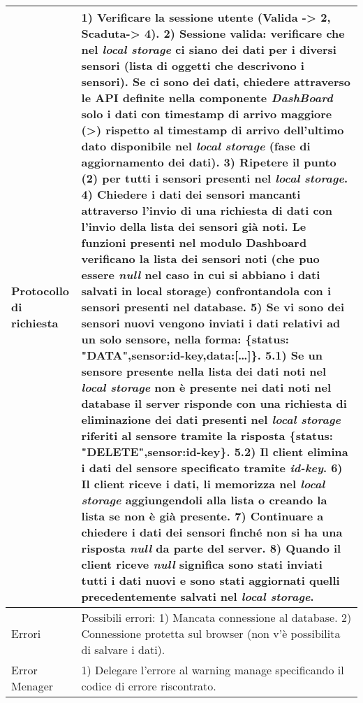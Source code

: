 \documentclass[onecolumn,a4paper]{article}
\begin{document}
\begin{longtable}{|p{3cm}|p{10cm}|}
Protocollo di richiesta & 1) Verificare la sessione utente (Valida -> 2, Scaduta-> 4). 2) Sessione valida: verificare che nel \emph{local storage} ci siano dei dati per i diversi sensori (lista di oggetti che descrivono i sensori). Se ci sono dei dati, chiedere attraverso le API definite nella componente \emph{DashBoard} solo i dati con timestamp di arrivo maggiore (>) rispetto al timestamp di arrivo dell'ultimo dato disponibile nel \emph{local storage} (fase di aggiornamento dei dati). 3) Ripetere il punto (2) per tutti i sensori presenti nel \emph{local storage}. 4) Chiedere i dati dei sensori mancanti attraverso l'invio di una richiesta di dati con l'invio della lista dei sensori già noti. Le funzioni presenti nel modulo Dashboard verificano la lista dei sensori noti (che puo essere \emph{null} nel caso in cui si abbiano i dati salvati in local storage) confrontandola con i sensori presenti nel database. 5) Se vi sono dei sensori nuovi vengono inviati i dati relativi ad un solo sensore, nella forma: \{status: "DATA",sensor:id-key,data:[\ldots{}]\}. 5.1) Se un sensore presente nella lista dei dati noti nel \emph{local storage} non è presente nei dati noti nel database il server risponde con una richiesta di eliminazione dei dati presenti nel \emph{local storage} riferiti al sensore tramite la risposta \{status: "DELETE",sensor:id-key\}. 5.2) Il client elimina i dati del sensore specificato tramite \emph{id-key}.  6) Il client riceve i dati, li memorizza nel \emph{local storage} aggiungendoli alla lista o creando la lista se non è già presente. 7) Continuare a chiedere i dati dei sensori finché non si ha una risposta \emph{null} da parte del server. 8) Quando il client riceve \emph{null} significa sono stati inviati tutti i dati nuovi e sono stati aggiornati quelli precedentemente salvati nel \emph{local storage}.\\
\hline
Errori & Possibili errori: 1) Mancata connessione al database. 2) Connessione protetta sul browser (non v'è possibilita di salvare i dati).\\
\hline
Error Menager & 1) Delegare l'errore al warning manage specificando il codice di errore riscontrato.\\
\hline
\end{longtable}
\end{document}
